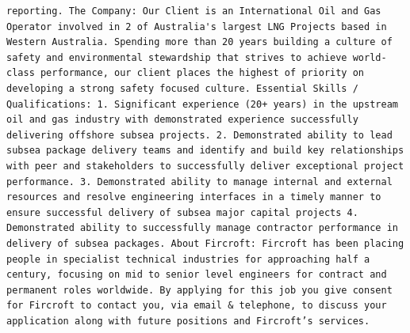\documentclass[11pt,a4paper,]{article}
\begin{document}
\begin{verbatim}
reporting. The Company: Our Client is an International Oil and Gas Operator involved in 2 of Australia's largest LNG Projects based in Western Australia. Spending more than 20 years building a culture of safety and environmental stewardship that strives to achieve world-class performance, our client places the highest of priority on developing a strong safety focused culture. Essential Skills / Qualifications: 1. Significant experience (20+ years) in the upstream oil and gas industry with demonstrated experience successfully delivering offshore subsea projects. 2. Demonstrated ability to lead subsea package delivery teams and identify and build key relationships with peer and stakeholders to successfully deliver exceptional project performance. 3. Demonstrated ability to manage internal and external resources and resolve engineering interfaces in a timely manner to ensure successful delivery of subsea major capital projects 4. Demonstrated ability to successfully manage contractor performance in delivery of subsea packages. About Fircroft: Fircroft has been placing people in specialist technical industries for approaching half a century, focusing on mid to senior level engineers for contract and permanent roles worldwide. By applying for this job you give consent for Fircroft to contact you, via email & telephone, to discuss your application along with future positions and Fircroft’s services.

\end{verbatim}
\end{document}
